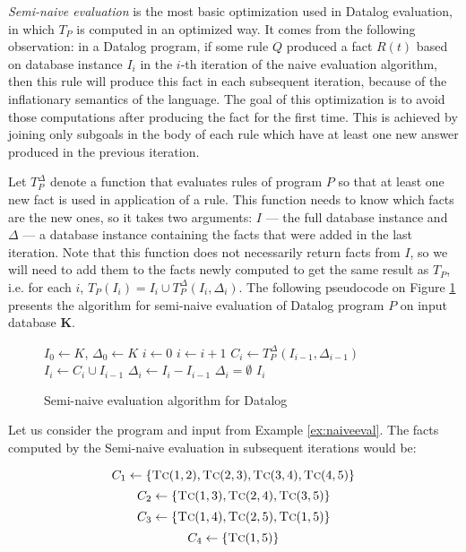 \emph{Semi-naive evaluation} is the most basic optimization used in Datalog evaluation, in which $T_P$ is computed in an optimized way. It comes from the following observation: in a Datalog program, if some rule $Q$ produced a fact $R(t)$ based on database instance $I_i$ in the $i$-th iteration of the naive evaluation algorithm, then this rule will produce this fact in each subsequent iteration, because of the inflationary semantics of the language. The goal of this optimization is to avoid those computations after producing the fact for the first time. This is achieved by joining only subgoals in the body of each rule which have at least one new answer produced in the previous iteration. 

Let $T^\Delta_P$ denote a function that evaluates rules of program $P$ so that at least one new fact is used in application of a rule. This function needs to know which facts are the new ones, so it takes two arguments: $I$ --- the full database instance and $\Delta$ --- a database instance containing the facts that were added in the last iteration. Note that this function does not necessarily return facts from $I$, so we will need to add them to the facts newly computed to get the same result as $T_P$, i.e. for each $i$, $T_P(I_i) = I_i \cup T_P^\Delta(I_i, \Delta_i)$. The following pseudocode on Figure \ref{psc:seminaiveevaldatalog} presents the algorithm for semi-naive evaluation of Datalog program $P$ on input database \textbf{K}.

\begin{figure}[!htbp]
\begin{codebox}
  \li $I_0 \leftarrow K$, $\Delta_0 \leftarrow K$
  \li $i \leftarrow 0$
  \li \Repeat
	\li $i \leftarrow i + 1$
	\li $C_i \leftarrow T_P^\Delta(I_{i-1}, \Delta_{i-1})$
	\li $I_i \leftarrow C_i \cup I_{i-1}$
	\li $\Delta_i \leftarrow I_i - I_{i-1}$
  \li \Until $\Delta_i = \emptyset$
  \li \Return $I_i$
\end{codebox}
\caption{Semi-naive evaluation algorithm for Datalog}\label{psc:seminaiveevaldatalog}
\end{figure}

\begin{exmp}
Let us consider the program and input from Example \ref{ex:naiveeval}. The facts computed by the Semi-naive evaluation in subsequent iterations would be:

$$C_1 \leftarrow \{\textsc{Tc}(1, 2), \textsc{Tc}(2, 3), \textsc{Tc}(3, 4), \textsc{Tc}(4, 5)\}$$
$$C_2 \leftarrow \{\textsc{Tc}(1, 3), \textsc{Tc}(2, 4), \textsc{Tc}(3, 5)\}$$
$$C_3 \leftarrow \{\textsc{Tc}(1, 4), \textsc{Tc}(2, 5), \textsc{Tc}(1, 5)\}$$
$$C_4 \leftarrow \{\textsc{Tc}(1, 5)\}$$
\label{ex:semieval}
\end{exmp}

